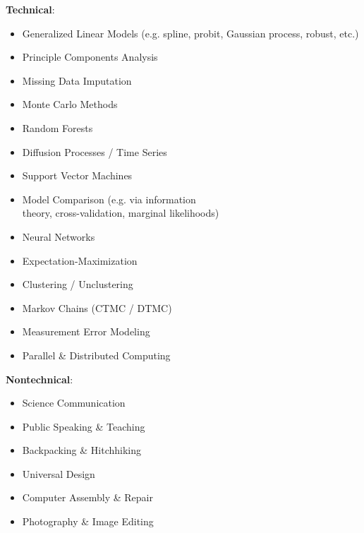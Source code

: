 \documentclass[11pt,margin,line]{resume}
\begin{document}
\begin{resume}
\textbf{Technical}:\vspace{-4.5mm}
\begin{multicols}{2}
    \begin{itemize}
    \setlength\itemsep{-0.2em}
         \item Generalized Linear Models (e.g. spline, probit, Gaussian process, robust, etc.)
         \item Principle Components Analysis
         \item Missing Data Imputation
	\item Monte Carlo Methods
         \item Random Forests
	\item Diffusion Processes / Time Series
         \item Support Vector Machines
	\item Model Comparison (e.g. via information\\ theory, cross-validation, marginal likelihoods)
         \item Neural Networks
	\item Expectation-Maximization
	\item Clustering / Unclustering
	\item Markov Chains (CTMC / DTMC)
	\item Measurement Error Modeling
	\item Parallel \& Distributed Computing
    \end{itemize}
    \end{multicols}\vspace{-4.5mm}

\begin{comment}
\textbf{Nontechnical}: Science Communication, Teaching, Hitchhiking, Public Speaking, Backpacking, Data Visualization, Computer Assembly \& Repair, Universal Design, Photography, Image Editing 
\end{comment}

\textbf{Nontechnical}:\vspace{-4.5mm}
\begin{multicols}{2}
    \begin{itemize}
    \setlength\itemsep{-0.2em}
         \item Science Communication 
         \item Public Speaking \& Teaching
         \item Backpacking \& Hitchhiking
         \item Universal Design
         \item Computer Assembly \& Repair
         \item Photography \& Image Editing
    \end{itemize}
    \end{multicols}\vspace{-4.5mm}


\end{resume}
\end{document}

